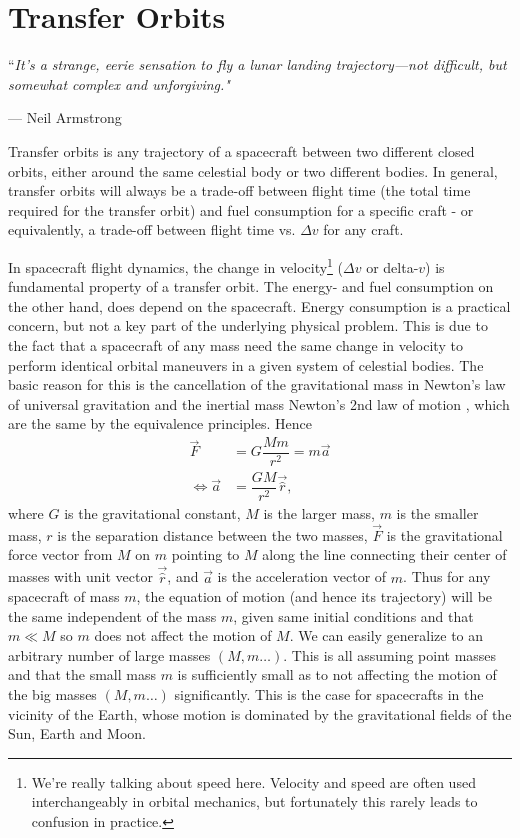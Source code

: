 \chapter{Transfer Orbits} \label{ch:transfer orbits}
\epigraph{``\itshape{It's a strange, eerie sensation to fly a lunar landing trajectory—not difficult, but somewhat complex and unforgiving.}"}{--- \textup{Neil Armstrong}}
Transfer orbits is any trajectory of a spacecraft between two different closed orbits, either around the same celestial body or two different bodies. In general, transfer orbits will always be a trade-off between flight time (the total time required for the transfer orbit) and fuel consumption for a specific craft - or equivalently, a trade-off between flight time vs. $\Delta v$ for any craft.

In spacecraft flight dynamics, the change in velocity\footnote{We're really talking about speed here. Velocity and speed are often used interchangeably in orbital mechanics, but fortunately this rarely leads to confusion in practice.} ($\Delta v$ or delta-$v$) is fundamental property of a transfer orbit. The energy- and fuel consumption on the other hand, does depend on the spacecraft. Energy consumption is a practical concern, but not a key part of the underlying physical problem. This is due to the fact that a spacecraft of any mass need the same change in velocity to perform identical orbital maneuvers in a given system of celestial bodies. The basic reason for this is the cancellation of the gravitational mass in Newton's law of universal gravitation and the inertial mass Newton's 2nd law of motion \cite{Knudsen2002}, which are the same by the equivalence principles. Hence
\begin{align}
\vec{F} &= G \dfrac{M m}{r^2} = m \vec{a} \\[0.3cm]
\Leftrightarrow \vec{a} &= \dfrac{G M}{r^2} \vec{\hat{r}} \label{eq:general-eom},
\end{align}
where $G$ is the gravitational constant, $M$ is the larger mass, $m$ is the smaller mass, $r$ is the separation distance between the two masses, $\vec{F}$ is the gravitational force vector from $M$ on $m$ pointing to $M$ along the line connecting their center of masses with unit vector $\vec{\hat{r}}$, and $\vec{a}$ is the acceleration vector of $m$. Thus for any spacecraft of mass $m$, the equation of motion (and hence its trajectory) will be the same independent of the mass $m$, given same initial conditions and that $m \ll M$ so $m$ does not affect the motion of $M$. We can easily generalize to an arbitrary number of large masses $(M, m \dots)$. This is all assuming point masses and that the small mass $m$ is sufficiently small as to not affecting the motion of the big masses $(M, m \dots)$ significantly. This is the case for spacecrafts in the vicinity of the Earth, whose motion is dominated by the gravitational fields of the Sun, Earth and Moon.

